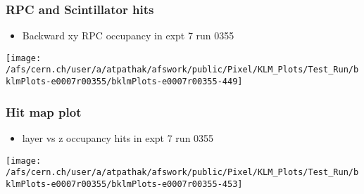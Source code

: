 \documentclass{beamer}
\begin{document}
\begin{frame}
\frametitle{RPC and Scintillator hits}
\vspace*{.05cm}

\begin{itemize} 
\item {\small Backward xy RPC occupancy in expt 7 run 0355}
\end{itemize}

\begin{center}
\begin{normalsize}

\vspace*{-.2cm}
\begin{center}

\texttt{[image: /afs/cern.ch/user/a/atpathak/afswork/public/Pixel/KLM\_Plots/Test\_Run/bklmPlots-e0007r00355/bklmPlots-e0007r00355-449]}\\
\end{center}
\end{normalsize}
\end{center}
\end{frame}
\begin{frame}
\frametitle{Hit map plot }
\vspace*{.05cm}

\begin{itemize} 
\item {\small layer vs z occupancy hits in expt 7 run 0355}
\end{itemize}

\begin{center}
\begin{normalsize}

\vspace*{-.2cm}
\begin{center}

\texttt{[image: /afs/cern.ch/user/a/atpathak/afswork/public/Pixel/KLM\_Plots/Test\_Run/bklmPlots-e0007r00355/bklmPlots-e0007r00355-453]}\\
\end{center}
\end{normalsize}
\end{center}
\end{frame}
\end{document}
